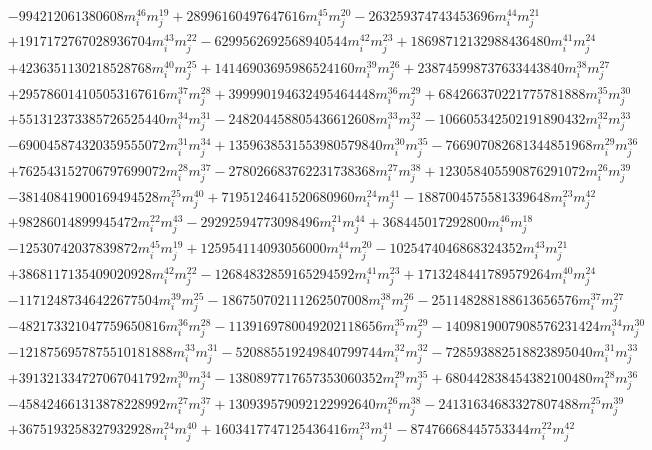 {\begin{align*}
&-994212061380608m_i^{46}m_j^{19}+28996160497647616m_i^{45}m_j^{20}-263259374743453696m_i^{44}m_j^{21}\\
&+1917172767028936704m_i^{43}m_j^{22}-6299562692568940544m_i^{42}m_j^{23}+18698712132988436480m_i^{41}m_j^{24}\\
&+4236351130218528768m_i^{40}m_j^{25}+14146903695986524160m_i^{39}m_j^{26}+238745998737633443840m_i^{38}m_j^{27}\\
&+295786014105053167616m_i^{37}m_j^{28}+399990194632495464448m_i^{36}m_j^{29}+684266370221775781888m_i^{35}m_j^{30}\\
&+551312373385726525440m_i^{34}m_j^{31}-248204458805436612608m_i^{33}m_j^{32}-106605342502191890432m_i^{32}m_j^{33}\\
&-690045874320359555072m_i^{31}m_j^{34}+1359638531553980579840m_i^{30}m_j^{35}-766907082681344851968m_i^{29}m_j^{36}\\
&+762543152706797699072m_i^{28}m_j^{37}-278026683762231738368m_i^{27}m_j^{38}+123058405590876291072m_i^{26}m_j^{39}\\
&-38140841900169494528m_i^{25}m_j^{40}+7195124641520680960m_i^{24}m_j^{41}-1887004575581339648m_i^{23}m_j^{42}\\
&+98286014899945472m_i^{22}m_j^{43}-29292594773098496m_i^{21}m_j^{44}+368445017292800m_i^{46}m_j^{18}\\
&-12530742037839872m_i^{45}m_j^{19}+125954114093056000m_i^{44}m_j^{20}-1025474046868324352m_i^{43}m_j^{21}\\
&+3868117135409020928m_i^{42}m_j^{22}-12684832859165294592m_i^{41}m_j^{23}+1713248441789579264m_i^{40}m_j^{24}\\
&-11712487346422677504m_i^{39}m_j^{25}-186750702111262507008m_i^{38}m_j^{26}-251148288188613656576m_i^{37}m_j^{27}\\
&-482173321047759650816m_i^{36}m_j^{28}-1139169780049202118656m_i^{35}m_j^{29}-1409819007908576231424m_i^{34}m_j^{30}\\
&-1218756957875510181888m_i^{33}m_j^{31}-520885519249840799744m_i^{32}m_j^{32}-728593882518823895040m_i^{31}m_j^{33}\\
&+391321334727067041792m_i^{30}m_j^{34}-1380897717657353060352m_i^{29}m_j^{35}+680442838454382100480m_i^{28}m_j^{36}\\
&-458424661313878228992m_i^{27}m_j^{37}+130939579092122992640m_i^{26}m_j^{38}-24131634683327807488m_i^{25}m_j^{39}\\
&+3675193258327932928m_i^{24}m_j^{40}+1603417747125436416m_i^{23}m_j^{41}-87476668445753344m_i^{22}m_j^{42}\\

\end{align*}}
